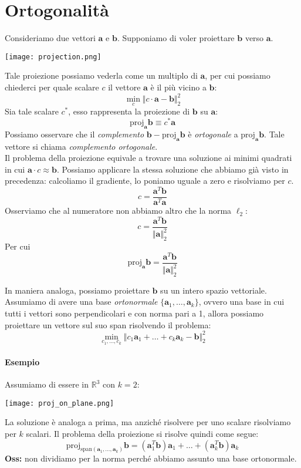 \documentclass{article}
\begin{document}
    \section{Ortogonalità}
        Consideriamo due vettori $\mathbf{a}$ e $\mathbf{b}$. Supponiamo di voler proiettare $\mathbf{b}$ verso $\mathbf{a}$. 
        \begin{center}\texttt{[image: projection.png]}\end{center}
        Tale proiezione possiamo vederla come un multiplo di $\mathbf{a}$, per cui possiamo chiederci per quale scalare $c$ il vettore
        $\mathbf{a}$ è il più vicino a $\mathbf{b}$:
        \[\min_c \Vert c \cdot \mathbf{a} - \mathbf{b} \Vert_2^2 \]
        Sia tale scalare $c^*$, esso rappresenta la proiezione di $\mathbf{b}$ su $\mathbf{a}$:
        \[ \text{proj}_\mathbf{a}\mathbf{b} \equiv c^*\mathbf{a}\] 
        Possiamo osservare che il \emph{complemento} $\mathbf{b} - \text{proj}_\mathbf{a}\mathbf{b}$ è \emph{ortogonale} a $\text{proj}_\mathbf{a}\mathbf{b}$. 
        Tale vettore si chiama \emph{complemento ortogonale}.\\
        Il problema della proiezione equivale a trovare una soluzione ai minimi quadrati in cui $\mathbf{a}\cdot c \approx \mathbf{b}$. Possiamo 
        applicare la stessa soluzione che abbiamo già visto in precedenza: calcoliamo il gradiente, lo poniamo uguale a zero e risolviamo per $c$.
        \[c = \frac{\mathbf{a}^T\mathbf{b}}{\mathbf{a}^T\mathbf{a}}\]
        Osserviamo che al numeratore non abbiamo altro che la norma $\ell_2$:
        \[c = \frac{\mathbf{a}^T\mathbf{b}}{\Vert \mathbf{a} \Vert_2^2}\]
        Per cui
        \[ \text{proj}_\mathbf{a}\mathbf{b} = \frac{\mathbf{a}^T\mathbf{b}}{\Vert \mathbf{a} \Vert_2^2}\]

        In maniera analoga, possiamo proiettare $\mathbf{b}$ su un intero spazio vettoriale. Assumiamo di avere una base \emph{ortonormale} $\{\mathbf{a}_1,\dots,\mathbf{a}_k\}$,
        ovvero una base in cui 
        tutti i vettori sono perpendicolari e con norma pari a 1,
        allora possiamo proiettare un vettore sul suo span risolvendo il problema:
        \[ \min_{c_1,\dots,c_k} \Vert c_1\mathbf{a}_1 + \dots + c_k\mathbf{a}_k - \mathbf{b} \Vert_2^2\]
        \paragraph{Esempio} Assumiamo di essere in $\mathbb{R}^3$ con $k=2$:
        \begin{center}\texttt{[image: proj\_on\_plane.png]}\end{center}
        La soluzione è analoga a prima, ma anziché risolvere per uno scalare risolviamo per $k$ scalari. Il problema della proiezione si 
        risolve quindi come segue:
        \[ \text{proj}_{\text{span}(\mathbf{a}_1, \dots, \mathbf{a}_k)} \mathbf{b} = (\mathbf{a}_1^T\mathbf{b})\mathbf{a}_1 + \dots + (\mathbf{a}_k^T \mathbf{b})\mathbf{a}_k\]
        \textbf{Oss:} non dividiamo per la norma perché abbiamo assunto una base ortonormale.
\end{document}
